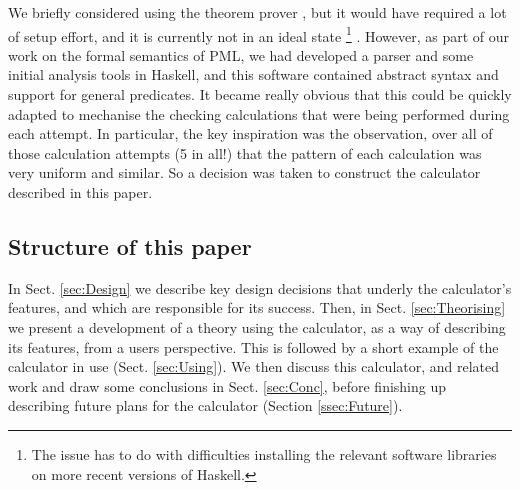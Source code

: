 We briefly considered using the  theorem prover
\cite{DBLP:conf/utp/Butterfield10,DBLP:conf/utp/Butterfield12},
but it would have required a lot of setup effort,
and it is currently not in an ideal state%
\footnote{The issue has to do with difficulties installing
the relevant software libraries
on more recent versions of Haskell.}
.
However, as part of our work on the formal semantics of PML,
we had developed a parser and some initial analysis tools
in Haskell\cite{Haskell2010},
and this software contained abstract syntax and support
for general predicates.
It became really obvious that this could be quickly adapted
to mechanise the checking calculations that were being performed
during each attempt.
In particular,
the key inspiration was the observation,
over all of those calculation attempts (5 in all!)
that the pattern of each calculation was very uniform and similar.
So a decision was taken to construct the calculator described in this paper.



\subsection{Structure of this paper}

In Sect. \ref{sec:Design}
we describe key design decisions
that underly the calculator's features,
and which are responsible for its success.
Then, in Sect. \ref{sec:Theorising}
we present a development of a theory using the calculator,
as a way of describing its features, from a users perspective.
This is followed by a short example of the calculator in use 
(Sect. \ref{sec:Using}).
We then discuss this calculator, and related work
and draw some conclusions in Sect. \ref{sec:Conc},
before finishing up describing future plans for the calculator
(Section \ref{ssec:Future}).
